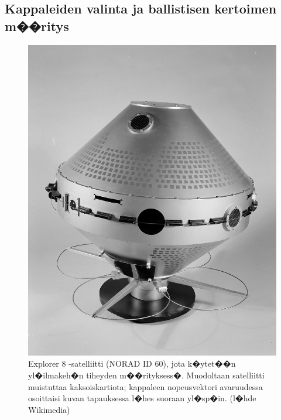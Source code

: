 \documentclass[12pt,a4paper,finnish,margin=2in]{article}
\begin{document}
\subsection{Kappaleiden valinta ja ballistisen kertoimen m��ritys}

\begin{figure}[t]
\centering
\includegraphics[scale = 0.25]{Explorer_8}
\caption{Explorer 8 -satelliitti (NORAD ID 60), jota k�ytet��n yl�ilmakeh�n tiheyden m��rityksess�. Muodoltaan satelliitti muistuttaa kaksoiskartiota; kappaleen nopeusvektori avaruudessa osoittaisi kuvan tapauksessa l�hes suoraan yl�sp�in. (l�hde Wikimedia)}
\label{fig:explorer8}
\end{figure}
\end{document}
